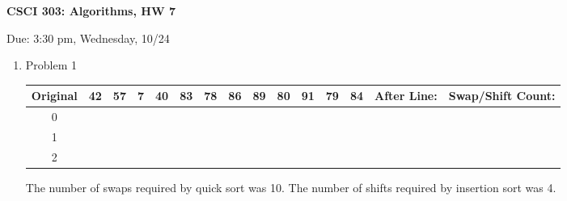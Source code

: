 \documentclass[11pt]{article}
\begin{document}
\begin{LARGE}
\centerline {\bf CSCI 303: Algorithms, HW 7}
\end{LARGE}
\vskip 0.25cm
\centerline{Due: 3:30 pm, Wednesday, 10/24}

\begin{enumerate}
\item Problem 1\\
\begin{center}
\begin{tabular}{c|cccccccccccc|cc}
Original & 42& 57& 7& 40& 83& 78& 86& 89& 80& 91& 79& 84 & After Line:& Swap/Shift Count:\\\hline
0&\\
1&\\
2&


\end{tabular}
\end{center}
The number of swaps required by quick sort was 10. The number of shifts required by insertion sort was 4.\\

\end{enumerate}
\end{document}
